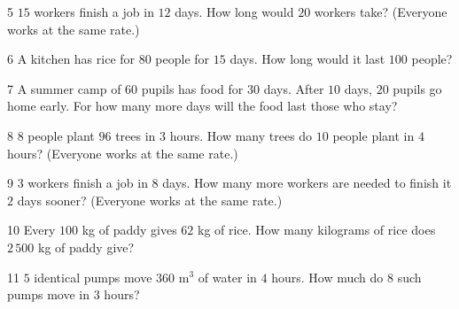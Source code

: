 \gap
\begin{probbox}{5}{\relax}
$15$ workers finish a job in $12$ days. How long would $20$ workers take? (Everyone works at the same rate.)
\end{probbox}
\gap
\begin{probbox}{6}{\relax}
A kitchen has rice for $80$ people for $15$ days. How long would it last $100$ people?
\end{probbox}
\gap
\begin{probbox}{7}{\relax}
A summer camp of $60$ pupils has food for $30$ days. After $10$ days, $20$ pupils go home early. For how many more days will the food last those who stay?
\end{probbox}
\gap
\begin{probbox}{8}{\relax}
$8$ people plant $96$ trees in $3$ hours. How many trees do $10$ people plant in $4$ hours? (Everyone works at the same rate.)
\end{probbox}
\gap
\begin{probbox}{9}{\relax}
$3$ workers finish a job in $8$ days. How many more workers are needed to finish it $2$ days sooner? (Everyone works at the same rate.)
\end{probbox}
\gap
\begin{probbox}{10}{\relax}
Every $100$ kg of paddy gives $62$ kg of rice. How many kilograms of rice does $2\,500$ kg of paddy give?
\end{probbox}
\gap
\begin{probbox}{11}{\relax}
$5$ identical pumps move $360$ m$^3$ of water in $4$ hours. How much do $8$ such pumps move in $3$ hours?
\end{probbox}
